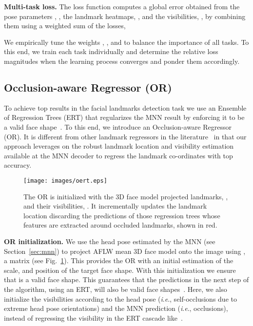 \documentclass[9pt,technote,compsoc]{IEEEtran}
\newcommand{\ie}{\textit{i}.\textit{e}., }
\begin{document}
\textbf{Multi-task loss.} 
The loss function  computes a global error obtained from the pose parameters , , the landmark heatmaps, , and the visibilities, , by combining them using a weighted sum of the losses,


We empirically tune the weights , ,  and  to balance the importance of all tasks. 
To this end, we train each task individually and determine the relative loss magnitudes when the learning process converges and ponder them accordingly.







\subsection{Occlusion-aware Regressor (OR)}
\label{sec:oert}

To achieve top results in the facial landmarks detection task we use an Ensemble of Regression Trees (ERT) that regularizes the MNN result by enforcing it to be a valid face shape~\cite{Cao14}. To this end, we introduce an Occlusion-aware Regressor (OR). It is different from other landmark regressors in the literature~\cite{Burgos13,Wu17,Valle18,Valle19b} in that our approach leverages on the robust landmark location and visibility estimation available at the MNN decoder to regress the landmark co-ordinates with top accuracy.

\begin{figure}
\centering
\texttt{[image: images/oert.eps]}
\caption{The OR is initialized with the 3D face model projected landmarks, , and their visibilities, . It incrementally updates the landmark location discarding the predictions of those regression trees whose features are extracted around occluded landmarks, shown in red.}
\label{fig:oert}
\end{figure}

\textbf{OR initialization.} We use the head pose estimated by the MNN (see Section~\ref{sec:mnn}) to project AFLW mean 3D face model onto the image using , a  matrix (see Fig.~\ref{fig:oert}). This provides the OR with an initial estimation of the scale, and position of the target face shape. With this initialization we ensure that  is a valid face shape. This guarantees that the predictions in the next step of the algorithm, using an ERT, will also be valid face shapes~\cite{Cao14}. Here, we also initialize the visibilities according to the head pose (\ie self-occlusions due to extreme head pose orientations) and the MNN prediction (\ie occlusions), instead of regressing the visibility in the ERT cascade like~\cite{Burgos13,Valle18,Valle19b}. 
\end{document}
